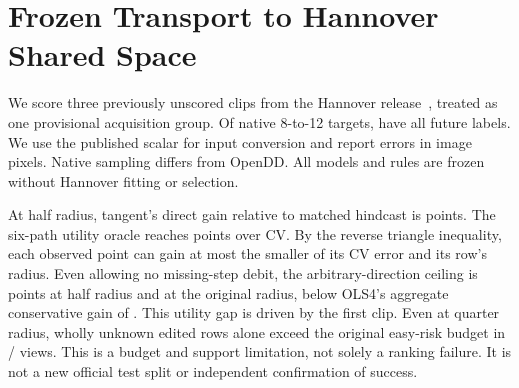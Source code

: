\section{Frozen Transport to Hannover Shared Space}
We score three previously unscored clips from the Hannover
release~\cite{hannoverrelease}, treated as one provisional acquisition
group. Of \HannoverTransferTargets{} native 8-to-12 targets,
\HannoverTransferComplete{} have all future labels. We use the
published scalar for input conversion and report errors in image
pixels. Native sampling differs from OpenDD. All models and rules
are frozen without Hannover fitting or selection.

At half radius, tangent's direct gain relative to matched hindcast is
\HannoverTransferTangent{} points. The six-path utility oracle reaches
\HannoverTransferOracle{} points over CV. By the reverse triangle
inequality, each observed point can gain at most the smaller of its
CV error and its row's radius. Even allowing no missing-step debit,
the arbitrary-direction ceiling is \HannoverTransferCap{} points at
half radius and \HannoverTransferOriginal{} at the original radius,
below OLS4's aggregate conservative gain of \HannoverTransferOLS{}.
This utility gap is driven by the first clip. Even at quarter radius,
wholly unknown edited rows alone exceed the original easy-risk budget
in \HannoverTransferRisk/\HannoverTransferViews{} views. This is a
budget and support limitation, not solely a ranking failure. It is
not a new official test split or independent confirmation of success.
